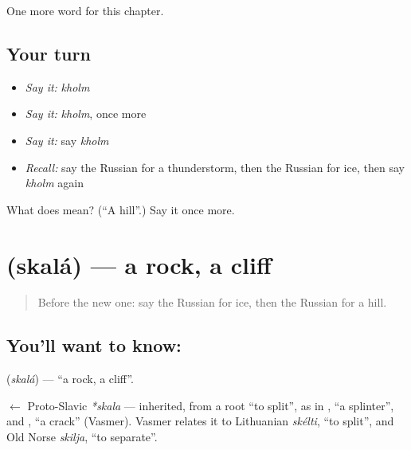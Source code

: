 \begin{grammarlens}[title={What you've built}]
One more word for this chapter.
\end{grammarlens}

\subsection*{Your turn}
\begin{itemize}
\raggedright
  \item \emph{Say it:} \emph{kholm}
  \item \emph{Say it:} \emph{kholm}, once more
  \item \emph{Say it:} say \emph{kholm}
  \item \emph{Recall:} say the Russian for a thunderstorm, then the Russian for ice, then say \emph{kholm} again
\end{itemize}

\begin{tcolorbox}[breakable,colback=teal!4,colframe=teal!35!black,title={Before you move on}]
What does  mean? (\textquotedblleft{}A hill\textquotedblright{}.) Say it once more.
\end{tcolorbox}
\section[\texorpdfstring{\ru{скала} (skalá)}{скала (skalá)}]{ (skalá) — a rock, a cliff}

\label{lesson:RU-C115-rock}



\begin{quote}
Before the new one: say the Russian for ice, then the Russian for a hill.
\end{quote}

\subsection*{You'll want to know: }
\textbf{} (\emph{skalá}) — \textquotedblleft{}a rock, a cliff\textquotedblright{}.

\begin{cousinweb}
\textbf{} $\leftarrow$ Proto-Slavic \emph{*skala} — inherited, from a root \textquotedblleft{}to split\textquotedblright{}, as in \emph{}, \textquotedblleft{}a splinter\textquotedblright{}, and \emph{}, \textquotedblleft{}a crack\textquotedblright{} (Vasmer). Vasmer relates it to Lithuanian \emph{skélti}, \textquotedblleft{}to split\textquotedblright{}, and Old Norse \emph{skilja}, \textquotedblleft{}to separate\textquotedblright{}.
\end{cousinweb}

